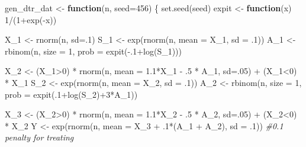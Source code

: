 \documentclass[
]{article}
\newenvironment{Shaded}{\begin{snugshade}}{\end{snugshade}}
\newcommand{\AttributeTok}[1]{\textcolor[rgb]{0.77,0.63,0.00}{#1}}
\newcommand{\CommentTok}[1]{\textcolor[rgb]{0.56,0.35,0.01}{\textit{#1}}}
\newcommand{\ControlFlowTok}[1]{\textcolor[rgb]{0.13,0.29,0.53}{\textbf{#1}}}
\newcommand{\DecValTok}[1]{\textcolor[rgb]{0.00,0.00,0.81}{#1}}
\newcommand{\FloatTok}[1]{\textcolor[rgb]{0.00,0.00,0.81}{#1}}
\newcommand{\FunctionTok}[1]{\textcolor[rgb]{0.00,0.00,0.00}{#1}}
\newcommand{\NormalTok}[1]{#1}
\newcommand{\OtherTok}[1]{\textcolor[rgb]{0.56,0.35,0.01}{#1}}
\newcommand{\SpecialCharTok}[1]{\textcolor[rgb]{0.00,0.00,0.00}{#1}}
\begin{document}
\begin{Shaded}
\begin{Highlighting}[]
\NormalTok{gen\_dtr\_dat }\OtherTok{\textless{}{-}} \ControlFlowTok{function}\NormalTok{(n, }\AttributeTok{seed=}\DecValTok{456}\NormalTok{)}
\NormalTok{\{}
\FunctionTok{set.seed}\NormalTok{(seed)}
\NormalTok{expit }\OtherTok{\textless{}{-}} \ControlFlowTok{function}\NormalTok{(x) }\DecValTok{1}\SpecialCharTok{/}\NormalTok{(}\DecValTok{1}\SpecialCharTok{+}\FunctionTok{exp}\NormalTok{(}\SpecialCharTok{{-}}\NormalTok{x))}

\NormalTok{X\_1 }\OtherTok{\textless{}{-}} \FunctionTok{rnorm}\NormalTok{(n, }\AttributeTok{sd=}\NormalTok{.}\DecValTok{1}\NormalTok{)}
\NormalTok{S\_1 }\OtherTok{\textless{}{-}} \FunctionTok{exp}\NormalTok{(}\FunctionTok{rnorm}\NormalTok{(n, }\AttributeTok{mean =}\NormalTok{ X\_1, }\AttributeTok{sd =}\NormalTok{ .}\DecValTok{1}\NormalTok{))}
\NormalTok{A\_1 }\OtherTok{\textless{}{-}} \FunctionTok{rbinom}\NormalTok{(n, }\AttributeTok{size =} \DecValTok{1}\NormalTok{, }\AttributeTok{prob =} \FunctionTok{expit}\NormalTok{(}\SpecialCharTok{{-}}\NormalTok{.}\DecValTok{1}\SpecialCharTok{+}\FunctionTok{log}\NormalTok{(S\_1)))}

\NormalTok{X\_2 }\OtherTok{\textless{}{-}}\NormalTok{ (X\_1}\SpecialCharTok{\textgreater{}}\DecValTok{0}\NormalTok{) }\SpecialCharTok{*} \FunctionTok{rnorm}\NormalTok{(n, }\AttributeTok{mean =} \FloatTok{1.1}\SpecialCharTok{*}\NormalTok{X\_1 }\SpecialCharTok{{-}}\NormalTok{ .}\DecValTok{5} \SpecialCharTok{*}\NormalTok{ A\_1, }\AttributeTok{sd=}\NormalTok{.}\DecValTok{05}\NormalTok{) }\SpecialCharTok{+}\NormalTok{ (X\_1}\SpecialCharTok{\textless{}}\DecValTok{0}\NormalTok{) }\SpecialCharTok{*}\NormalTok{ X\_1}
\NormalTok{S\_2 }\OtherTok{\textless{}{-}} \FunctionTok{exp}\NormalTok{(}\FunctionTok{rnorm}\NormalTok{(n, }\AttributeTok{mean =}\NormalTok{ X\_2, }\AttributeTok{sd =}\NormalTok{ .}\DecValTok{1}\NormalTok{))}
\NormalTok{A\_2 }\OtherTok{\textless{}{-}} \FunctionTok{rbinom}\NormalTok{(n, }\AttributeTok{size =} \DecValTok{1}\NormalTok{, }\AttributeTok{prob =} \FunctionTok{expit}\NormalTok{(.}\DecValTok{1}\SpecialCharTok{+}\FunctionTok{log}\NormalTok{(S\_2)}\SpecialCharTok{+}\DecValTok{3}\SpecialCharTok{*}\NormalTok{A\_1))}

\NormalTok{X\_3 }\OtherTok{\textless{}{-}}\NormalTok{ (X\_2}\SpecialCharTok{\textgreater{}}\DecValTok{0}\NormalTok{) }\SpecialCharTok{*} \FunctionTok{rnorm}\NormalTok{(n, }\AttributeTok{mean =} \FloatTok{1.1}\SpecialCharTok{*}\NormalTok{X\_2 }\SpecialCharTok{{-}}\NormalTok{ .}\DecValTok{5} \SpecialCharTok{*}\NormalTok{ A\_2, }\AttributeTok{sd=}\NormalTok{.}\DecValTok{05}\NormalTok{) }\SpecialCharTok{+}\NormalTok{ (X\_2}\SpecialCharTok{\textless{}}\DecValTok{0}\NormalTok{) }\SpecialCharTok{*}\NormalTok{ X\_2}
\NormalTok{Y }\OtherTok{\textless{}{-}} \FunctionTok{exp}\NormalTok{(}\FunctionTok{rnorm}\NormalTok{(n, }\AttributeTok{mean =}\NormalTok{ X\_3 }\SpecialCharTok{+}\NormalTok{ .}\DecValTok{1}\SpecialCharTok{*}\NormalTok{(A\_1 }\SpecialCharTok{+}\NormalTok{ A\_2), }\AttributeTok{sd =}\NormalTok{ .}\DecValTok{1}\NormalTok{)) }\CommentTok{\#0.1 penalty for treating}


\end{Highlighting}
\end{Shaded}
\end{document}

